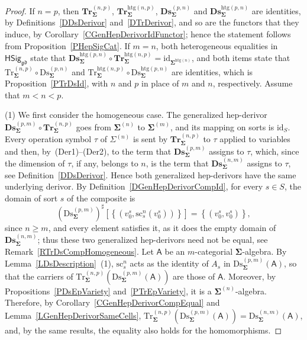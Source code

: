 \documentclass[a4paper, reqno]{amsbook}
\newcommand{\sig}[1]{\mathbf{#1}}             %
\newcommand{\calg}[1]{\boldsymbol{\mathsf{#1}}} %
\newcommand{\gd}{\mathfrak{gd}}              %
\newcommand{\htg}{\mathrm{htg}}                %
\newcommand{\id}{\mathrm{id}}
\newcommand{\src}{\mathrm{sc}}
\newcommand{\Ds}{\mathrm{Ds}}
\newcommand{\Tr}{\mathrm{Tr}}
\newcommand{\bDs}{\mathbf{Ds}}
\newcommand{\bTr}{\mathbf{Tr}}
\theoremstyle{plain}
\theoremstyle{definition}
\begin{document}
\begin{proof}
If $n=p$, then $\bTr^{(n,p)}_{\sig{\Sigma}}$, $\bTr^{\htg(n,p)}_{\sig{\Sigma}}$, $\bDs^{(p,n)}_{\sig{\Sigma}}$ and $\bDs^{\htg(p,n)}_{\sig{\Sigma}}$ are identities, by Definitions~\ref{DDsDerivor} and~\ref{DTrDerivor}, and so are the functors that they induce, by Corollary~\ref{CGenHepDerivorIdFunctor}; hence the statement follows from Proposition~\ref{PHepSigCat}.
If $m=n$, both heterogeneous equalities in $\mathsf{HSig}_{\gd}$ state that $\bDs^{\htg(p,n)}_{\sig{\Sigma}}\circ\bTr^{\htg(n,p)}_{\sig{\Sigma}}=\id_{\sig{\Sigma}^{\htg(n)}}$, and both items state that $\Tr^{(n,p)}_{\sig{\Sigma}}\circ\Ds^{(p,n)}_{\sig{\Sigma}}$ and $\Tr^{\htg(n,p)}_{\sig{\Sigma}}\circ\Ds^{\htg(p,n)}_{\sig{\Sigma}}$ are identities, which is Proposition~\ref{PTrDsId}, with $n$ and $p$ in place of $m$ and $n$, respectively.
Assume that $m<n<p$.

(1) We first consider the homogeneous case.
The generalized hep-derivor $\bDs^{(p,m)}_{\sig{\Sigma}}\circ\bTr^{(n,p)}_{\sig{\Sigma}}$ goes from $\sig{\Sigma}^{(n)}$ to $\sig{\Sigma}^{(m)}$, and its mapping on sorts is $\id_{S}$.
Every operation symbol $\tau$ of $\Sigma^{(n)}$ is sent by $\bTr^{(n,p)}_{\sig{\Sigma}}$ to $\tau$ applied to variables and then, by~(Der1)--(Der2), to the term that $\bDs^{(p,m)}_{\sig{\Sigma}}$ assigns to $\tau$, which, since the dimension of $\tau$, if any, belongs to $n$, is the term that $\bDs^{(n,m)}_{\sig{\Sigma}}$ assigns to $\tau$, see Definition~\ref{DDsDerivor}.
Hence both generalized hep-derivors have the same underlying derivor.
By Definition~\ref{DGenHepDerivorCompId}, for every $s\in S$, the domain of sort $s$ of the composite is
\[
\left(\Ds^{(p,m)}_{\sig{\Sigma}}\right)^{\sharp}\left[\left\lbrace\left(v^{s}_{0},\src^{n}_{s}(v^{s}_{0})\right)\right\rbrace\right]=\left\lbrace\left(v^{s}_{0},v^{s}_{0}\right)\right\rbrace,
\]
since $n\geq m$, and every element satisfies it, as it does the empty domain of $\bDs^{(n,m)}_{\sig{\Sigma}}$; thus these two generalized hep-derivors need not be equal, see Remark~\ref{RTrDsCompHomogeneous}.
Let $\calg{A}$ be an $m$-categorial $\sig{\Sigma}$-algebra.
By Lemma~\ref{LDsDescription}~(1), $\src^{n}_{s}$ acts as the identity of $A_{s}$ in $\Ds^{(p,m)}_{\sig{\Sigma}}(\calg{A})$, so that the carriers of $\Tr^{(n,p)}_{\sig{\Sigma}}(\Ds^{(p,m)}_{\sig{\Sigma}}(\calg{A}))$ are those of $\calg{A}$.
Moreover, by Propositions~\ref{PDsEpVariety} and~\ref{PTrEpVariety}, it is a $\sig{\Sigma}^{(n)}$-algebra.
Therefore, by Corollary~\ref{CGenHepDerivorCompEqual} and Lemma~\ref{LGenHepDerivorSameCells}, $\Tr^{(n,p)}_{\sig{\Sigma}}(\Ds^{(p,m)}_{\sig{\Sigma}}(\calg{A}))=\Ds^{(n,m)}_{\sig{\Sigma}}(\calg{A})$, and, by the same results, the equality also holds for the homomorphisms.


\end{proof}
\end{document}

